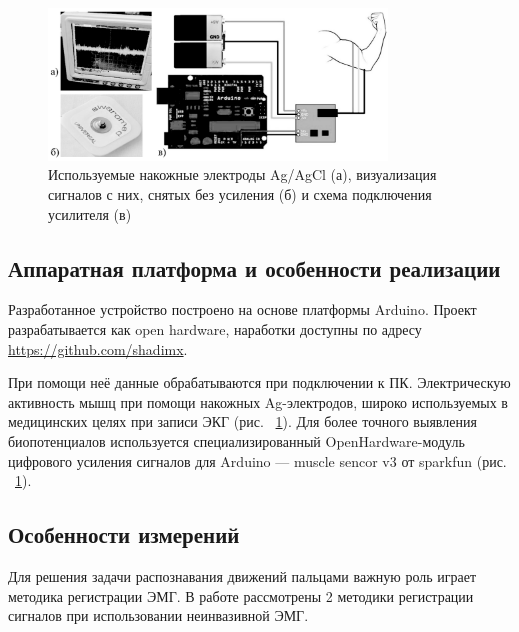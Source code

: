\documentclass[10pt, a5paper]{article}
\begin{document}
\begin{center}

\begin{figure}[h!]
  \centering
  \includegraphics[width=9cm]{Shamonin1.PNG}
  \caption{Используемые накожные электроды Ag/AgCl (а), визуализация сигналов с них, снятых без усиления (б) и схема подключения усилителя (в)}
  \label{Shamonin1}

\end{figure}

\end{center}


\subsection*{Аппаратная платформа и особенности реализации}

Разработанное устройство построено на основе платформы Arduino. Проект разрабатывается как open hardware, наработки доступны по адресу \url{https://github.com/shadimx}.

При помощи неё данные обрабатываются при подключении к ПК. Электрическую активность мышц при помощи накожных Ag-электродов, широко используемых в медицинских целях при записи ЭКГ (рис. ~\ref{Shamonin1}). Для более точного выявления биопотенциалов используется специализированный OpenHardware-модуль цифрового усиления сигналов для Arduino — muscle sencor v3 от sparkfun (рис. ~\ref{Shamonin1}).

\subsection*{Особенности измерений}

Для решения задачи распознавания движений пальцами важную роль играет методика регистрации ЭМГ. В работе рассмотрены 2 методики регистрации сигналов при использовании неинвазивной ЭМГ.
\end{document}
